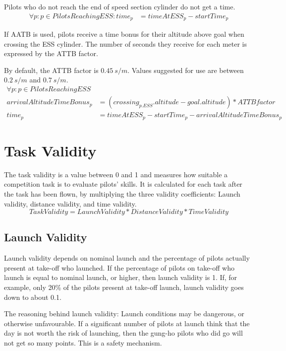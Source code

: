\documentclass{article}
\begin{document}
Pilots who do not reach the end of speed section cylinder do not get a time.
\begin{align*}
    \forall p : p \in PilotsReachingESS : time_p &= timeAtESS_p - startTime_p
\end{align*}

\begin{pg}
If AATB is used, pilots receive a time bonus for their altitude above goal when crossing the ESS cylinder.
The number of seconds they receive for each meter is expressed by the ATTB factor.

By default, the ATTB factor is \(0.45 \ s/m\). Values suggested for use are between \(0.2 \ s/m\) and \(0.7 \ s/m\).
\begin{align*}
    \forall p : p \in PilotsReachingESS \\
    arrivalAltitudeTimeBonus_p &= (crossing_{p.ESS} . altitude - goal . altitude) * ATTBfactor \\
    time_p &= timeAtESS_p - startTime_p - arrivalAltitudeTimeBonus_p
\end{align*}
\end{pg}

\newpage
\section{Task Validity}
\label{sec:task-validity}
The task validity is a value between 0 and 1 and measures how suitable
a competition task is to evaluate pilots’ skills. It is calculated for each
task after the task has been flown, by multiplying the three validity
coefficients: Launch validity, distance validity, and time validity.
\begin{equation*}
    TaskValidity = LaunchValidity * DistanceValidity * TimeValidity
\end{equation*}

\subsection{Launch Validity}
\label{sec:launch-validity}
Launch validity depends on nominal launch and the percentage of pilots actually
present at take-off who launched. If the percentage of pilots on take-off who
launch is equal to nominal launch, or higher, then launch validity is 1. If,
for example, only 20\% of the pilots present at take-off launch, launch
validity goes down to about 0.1.

The reasoning behind launch validity: Launch conditions may be dangerous, or
otherwise unfavourable.  If a significant number of pilots at launch think that
the day is not worth the risk of launching, then the gung-ho pilots who did go
will not get so many points. This is a safety mechanism.
\end{document}
